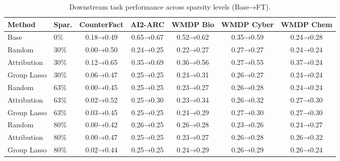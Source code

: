 \begin{table}[t]
\centering
\caption{Downstream task performance across sparsity levels (Base→FT).}
\label{tab:pruned_results}
\small
\begin{tabular}{llccccc}
\hline
\textbf{Method} & \textbf{Spar.} & \textbf{CounterFact} & \textbf{AI2-ARC} & \textbf{WMDP Bio} & \textbf{WMDP Cyber} & \textbf{WMDP Chem} \\
\hline
Base & 0\% & 0.18→0.49 & 0.65→0.67 & 0.52→0.62 & 0.35→0.59 & 0.24→0.28 \\
\hline
Random & 30\% & 0.00→0.50 & 0.24→0.25 & 0.22→0.27 & 0.27→0.27 & 0.24→0.24 \\
Attribution & 30\% & 0.12→0.65 & 0.35→0.69 & 0.36→0.56 & 0.27→0.55 & 0.37→0.24 \\
Group Lasso & 30\% & 0.06→0.47 & 0.25→0.25 & 0.24→0.31 & 0.26→0.27 & 0.24→0.24 \\
\hline
Random & 63\% & 0.00→0.45 & 0.25→0.25 & 0.23→0.27 & 0.26→0.28 & 0.24→0.24 \\
Attribution & 63\% & 0.02→0.52 & 0.25→0.30 & 0.23→0.34 & 0.26→0.32 & 0.27→0.30 \\
Group Lasso & 63\% & 0.03→0.45 & 0.25→0.25 & 0.24→0.29 & 0.27→0.30 & 0.27→0.30 \\
\hline
Random & 80\% & 0.00→0.42 & 0.26→0.25 & 0.26→0.28 & 0.23→0.26 & 0.24→0.27 \\
Attribution & 80\% & 0.00→0.47 & 0.25→0.25 & 0.23→0.27 & 0.26→0.28 & 0.26→0.32 \\
Group Lasso & 80\% & 0.02→0.44 & 0.25→0.25 & 0.24→0.29 & 0.26→0.29 & 0.26→0.24 \\
\hline
\end{tabular}
\end{table}